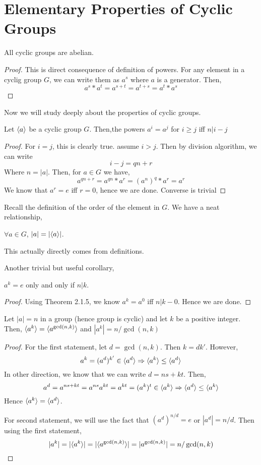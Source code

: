 \section{Elementary Properties of Cyclic Groups}
\begin{theorem}
    All cyclic groups are abelian.
\end{theorem}
\begin{proof}
    This is direct consequence of definition of powers. For any element in a cyclig group $G$, we can write them as $a^s$ where $a$ is a
    generator. Then,
    \[ a^s \ast a^t = a^{s+t} = a^{t+s} = a^t \ast a^s\]
\end{proof}
Now we will study deeply about the properties of cyclic groups.
\begin{theorem}
    Let $\langle{a} \rangle$ be a cyclic group $G$. Then,the powers $a^i = a^j$ for $i \ge j$ iff  $n | i-j$
\end{theorem}
\begin{proof}
    For $i=j$, this is clearly true. assume $i > j$. Then by division algorithm, we can write
    \[ i-j = qn + r\]
    Where $n = |a|$. Then, for $a \in G$ we have,
    \[ a^{qn+r} = a^{qn} \ast a^r= (a^{n})^q \ast a^r = a^r\]
    We know that $a^r = e$ iff $r = 0$, hence we are done. Converse is trivial
\end{proof}
Recall the definition of the order of the element in $G$. We have a neat relationship,
\begin{corollary}
    $\forall a \in G$, $|a| = |\langle{a} \rangle|$.

    This actually directly comes from definitions.
\end{corollary}
Another trivial but useful corollary,
\begin{corollary}
    $a^k = e$ only and only if $n | k$.
\end{corollary}
\begin{proof}
    Using Theorem 2.1.5, we know $a^k = a^0$ iff $n | k-0$. Hence we are done.
\end{proof}

\begin{theorem}
    Let $|a| = n$ in a group (hence group is cyclic) and let $k$ be a positive integer. Then, $\langle{a^k} \rangle= \langle{a^{\gcd(n,k)}} \rangle$ and $|a^k| =
    n/\gcd(n,k)$
\end{theorem}
\begin{proof}
    For the first statement, let $d = \gcd(n,k)$. Then $k = dk'$. However,
    \[ a^k = (a^d)^{k'} \in \langle{a^d} \rangle \Rightarrow \langle{a^k} \rangle \le \langle{a^d} \rangle\]
    In other direction, we know that we can write $d= ns + kt$. Then,
    \[ a^d = a^{ns + kt} = a^{ns}a^{kt} = a^{kt} = (a^k)^t \in \langle{a^k} \rangle \Rightarrow  \langle{a^d} \rangle \le \langle{a^k} \rangle\]
    Hence $\langle{a^k} \rangle = \langle{a^d} \rangle$.

    For second statement, we will use the fact that $(a^d)^{n/d} = e$ or $|a^d| = n/d$. Then using the first statement,
    \[ |a^k| = |\langle{a^k} \rangle| = |\langle{a^{\gcd(n,k)}} \rangle|  = |a^{\gcd(n,k)}| = n / \gcd(n,k)\]
\end{proof}
